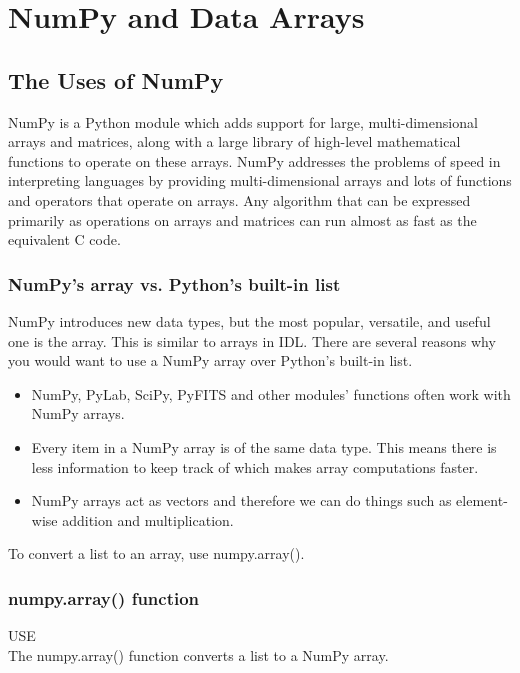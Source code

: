 \chapter{NumPy and Data Arrays}
\label{ch:numpy}

\section{The Uses of NumPy }
NumPy is a Python module which adds support for large,
multi-dimensional arrays and matrices, along with a large library of
high-level mathematical functions to operate on these arrays. NumPy
addresses the problems of speed in interpreting languages by providing
multi-dimensional arrays and lots of functions and operators that
operate on arrays. Any algorithm that can be expressed primarily as
operations on arrays and matrices can run almost as fast as the
equivalent C code.

\subsection{NumPy's array vs. Python's built-in list}
NumPy introduces new data types, but the most popular, versatile, and
useful one is the array.  This is similar to arrays in IDL.  There
are several reasons why you would want to use a NumPy array over
Python's built-in list.
\begin{itemize}
\item NumPy, PyLab, SciPy, PyFITS and other modules' functions often
  work with NumPy arrays.
\item Every item in a NumPy array is of the same data type.  This
  means there is less information to keep track of which makes array
  computations faster.
\item NumPy arrays act as vectors and therefore we can do things such
  as element-wise addition and multiplication.
\end{itemize}

To convert a list to an array, use {\sf \small numpy.array()}.

\subsection{ {\sf numpy.array() } function}
  {\color{blue} {\sf\small USE}} \\
  The {\sf\small numpy.array()} function converts a list to a NumPy
  array.  

